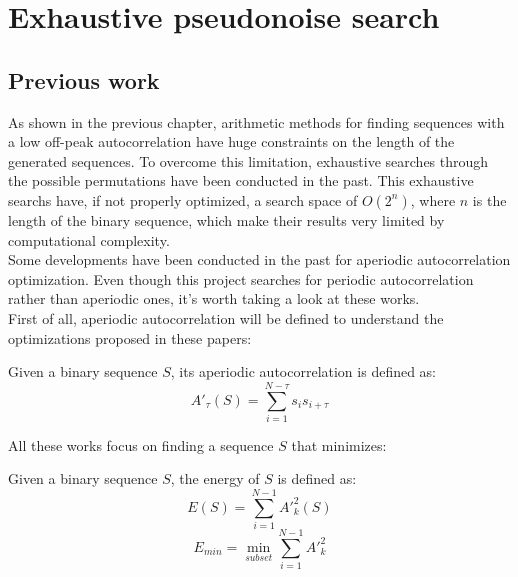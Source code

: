 \chapter{Exhaustive pseudonoise search}
  \section{Previous work}

  As shown in the previous chapter, arithmetic methods for finding sequences
  with a low off-peak autocorrelation have huge constraints on the length of
  the generated sequences. To overcome this limitation, exhaustive searches
  through the possible permutations have been conducted in the past. This
  exhaustive searchs have, if not properly optimized, a search space of
  $O(2^n)$, where $n$ is the length of the binary sequence, which make their
  results very limited by computational complexity.\\

  Some developments have been conducted in the past for aperiodic
  autocorrelation optimization. Even though this project searches for periodic
  autocorrelation rather than aperiodic ones, it's worth taking a look
  at these works.\\

  First of all, aperiodic autocorrelation will be defined to understand
  the optimizations proposed in these papers:\\
  \begin{definition}
      Given a binary sequence $S$, its aperiodic autocorrelation is defined as:
      \begin{equation}
        A'_{\tau}(S) = \sum_{i=1}^{N-\tau}s_{i}s_{i+\tau}
      \end{equation}
  \end{definition}

  All these works focus on finding a sequence $S$ that minimizes:

  \begin{definition} Given a binary sequence $S$, the energy of $S$ is defined
    as:
    \begin{equation}
      E(S) = \sum_{i=1}^{N-1} A'^{2}_{k}(S)
    \end{equation}
    \begin{equation}
      E_{min} = \operatorname*{min}_{subset} \sum_{i=1}^{N-1} A'^{2}_{k}
    \end{equation}
  \end{definition}

